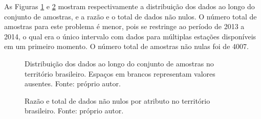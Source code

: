 As Figuras \ref{fig:distributionall} e \ref{fig:nulltotalall} mostram respectivamente a distribuição dos dados ao longo do conjunto de amostras, e a razão e o total de dados não nulos. O número total de amostras para este problema é menor, pois se restringe ao período de 2013 a 2014, o qual era o único intervalo com dados para múltiplas estações disponíveis em um primeiro momento. O número total de amostras não nulas foi de 4007.

\begin{figure}[H]
\centering
{}
\caption{Distribuição dos dados ao longo do conjunto de amostras no território brasileiro. Espaços em brancos representam valores ausentes. Fonte: próprio autor.}
\label{fig:distributionall}
\end{figure}

\begin{figure}[H]
\centering
{}
\caption{Razão e total de dados não nulos por atributo no território brasileiro. Fonte: próprio autor.}
\label{fig:nulltotalall}
\end{figure}


